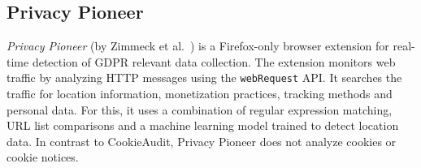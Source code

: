 \subsection{Privacy Pioneer}
\emph{Privacy Pioneer} (by Zimmeck et al.~\cite{zimmeck2024pioneer}) is a Firefox-only browser extension for real-time detection of GDPR relevant data collection.
The extension monitors web traffic by analyzing HTTP messages using the \verb|webRequest| API.
It searches the traffic for location information, monetization practices, tracking methods and personal data. 
For this, it uses a combination of regular expression matching, URL list comparisons and a machine learning model trained to detect location data.
In contrast to CookieAudit, Privacy Pioneer does not analyze cookies or cookie notices.

